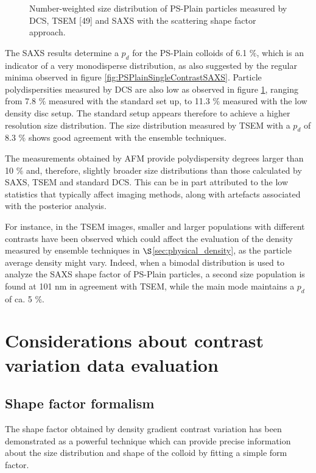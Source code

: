 \begin{figure}
	\begin{center}
		
	\end{center}
	\caption{Number-weighted size distribution of PS-Plain particles measured by DCS, TSEM [49] and SAXS with the scattering shape factor approach.}
	\label{fig:PSPlainSizeDistribution}
\end{figure}

The SAXS results determine a $p_d$ for the PS-Plain colloids of 6.1 $\%$, which is an indicator of a very monodisperse distribution, as also suggested by the regular minima observed in figure \ref{fig:PSPlainSingleContrastSAXS}. Particle polydispersities measured by DCS are also low as observed in figure \ref{fig:PSPlainSizeDistribution}, ranging from 7.8 $\%$ measured with the standard set up, to 11.3 $\%$ measured with the low density disc setup. The standard setup appears therefore to achieve a higher resolution size distribution. The size distribution measured by TSEM with a $p_d$ of 8.3 $\%$ shows good agreement with the ensemble techniques.

The measurements obtained by AFM provide polydispersity degrees larger than 10 $\%$\citep{nicolet_interlaboratory_2015} and, therefore, slightly broader size distributions than those calculated by SAXS, TSEM and standard DCS. This can be in part attributed to the low statistics that typically affect imaging methods, along with artefacts associated with the posterior analysis.

For instance, in the TSEM images\citep{nicolet_interlaboratory_2015}, smaller and larger populations with different contrasts have been observed which could affect the evaluation of the density measured by ensemble techniques in $\S$\ref{sec:physical_density}, as the particle average density might vary. Indeed, when a bimodal distribution is used to analyze the SAXS shape factor of PS-Plain particles, a second size population is found at 101 nm in agreement with TSEM, while the main mode maintains a $p_d$ of ca. 5 $\%$.

\section{Considerations about contrast variation data evaluation}
\subsection{Shape factor formalism}
The shape factor obtained by density gradient contrast variation has been demonstrated as a powerful technique which can provide precise information about the size distribution and shape of the colloid by fitting a simple form factor.

